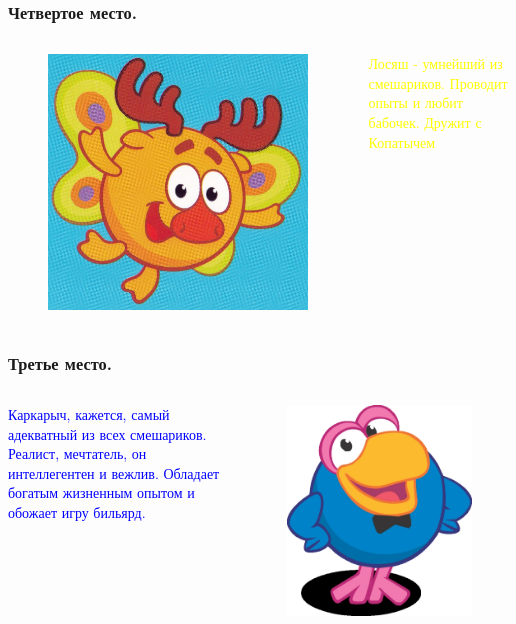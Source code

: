 \documentclass[roman, 12pt]{beamer}
\begin{document}
	\begin{frame}
		\frametitle{Четвертое место.}
		
		\begin {columns}
		\begin{figure}
			\includegraphics[width=0.7\linewidth]{images/losyash}
		\end{figure}
		\textcolor{yellow}{Лосяш - умнейший из смешариков. Проводит опыты и любит бабочек. Дружит с Копатычем}
		\end {columns}		
	\end {frame}
		
	\begin{frame}
		\frametitle{Третье место.}
		
		\begin {columns}
		\column{0.7\textwidth}
		\textcolor{blue}{Каркарыч, кажется, самый адекватный из всех смешариков. Реалист, мечтатель, он интеллегентен и вежлив. Обладает богатым жизненным опытом и обожает игру бильярд.}
		\column{0.7\textwidth}
		\begin{figure}
			\includegraphics[width=0.7\linewidth]{images/karkarich}
		\end{figure}
		\end {columns}		
		
	\end {frame}
			
\end{document}
